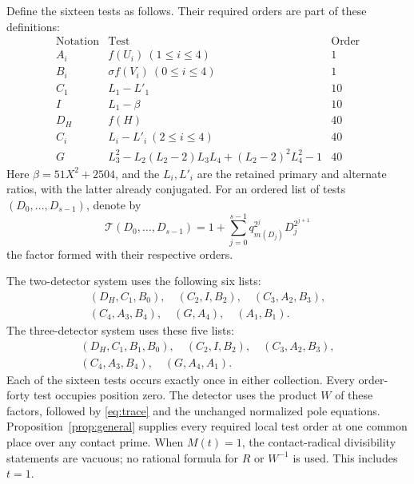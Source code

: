 \documentclass[11pt,a4paper]{article}
\theoremstyle{remark}\newtheorem{remark}[theorem]{Remark}
\begin{document}
Define the sixteen tests as follows. Their required orders are part of
these definitions:
\[
 \begin{array}{c|c|c}
 \text{Notation}&\text{Test}&\text{Order}\\\hline
 A_i&f(U_i)\ (1\le i\le4)&1\\
 B_i&\sigma f(V_i)\ (0\le i\le4)&1\\
 C_1&L_1-L'_1&10\\
 I&L_1-\beta&10\\
 D_H&f(H)&40\\
 C_i&L_i-L'_i\ (2\le i\le4)&40\\
 G&L_3^2-L_2(L_2-2)L_3L_4+(L_2-2)^2L_4^2-1&40
 \end{array}
\]
Here $\beta=51X^2+2504$, and the $L_i,L'_i$ are the retained primary
and alternate ratios, with the latter already conjugated. For an
ordered list of tests $(D_0,\ldots,D_{s-1})$, denote by
\begin{equation}\label{eq:factor}
 \mathcal T(D_0,\ldots,D_{s-1})
   =1+\sum_{j=0}^{s-1}q_{m(D_j)}^{2^j}D_j^{2^{j+1}}
\end{equation}
the factor formed with their respective orders.

The two-detector system uses the following six lists:
\begin{equation}\label{eq:lists301}
 \begin{gathered}
 (D_H,C_1,B_0),\quad(C_2,I,B_2),\quad(C_3,A_2,B_3),\\
 (C_4,A_3,B_4),\quad(G,A_4),\quad(A_1,B_1).
 \end{gathered}
\end{equation}
The three-detector system uses these five lists:
\begin{equation}\label{eq:lists351}
 \begin{gathered}
 (D_H,C_1,B_1,B_0),\quad(C_2,I,B_2),\quad(C_3,A_2,B_3),\\
 (C_4,A_3,B_4),\quad(G,A_4,A_1).
 \end{gathered}
\end{equation}
Each of the sixteen tests occurs exactly once in either collection.
Every order-forty test occupies position zero. The detector uses the
product $W$ of these factors, followed by \eqref{eq:trace} and the
unchanged normalized pole equations. Proposition~\ref{prop:general}
supplies every required local test order at one common place over
any contact prime. When $M(t)=1$, the contact-radical divisibility
statements are vacuous; no rational formula for $R$ or $W^{-1}$ is
used. This includes $t=1$.
\end{document}

